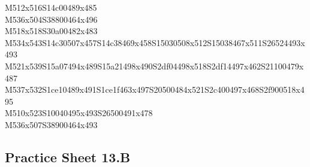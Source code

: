 \documentclass{article}
\begin{document}
\begin{multicols}{5}
\begin{center}
M512x516S14c00489x485 %
\\M536x504S38800464x496 %
\\M518x518S30a00482x483 %
\\M534x543S14c30507x457S14c38469x458S15030508x512S15038467x511S26524493x493 %
\\M521x539S15a07494x489S15a21498x490S2df04498x518S2df14497x462S21100479x487 %
\\M537x532S1ce10489x491S1ce1f463x497S20500484x521S2c400497x468S2f900518x495 %
\\M510x523S10040495x493S26500491x478 %
\\M536x507S38900464x493 %
\vfil

\end{center}
\end{multicols}

\subsection{Practice Sheet 13.B}
\end{document}
